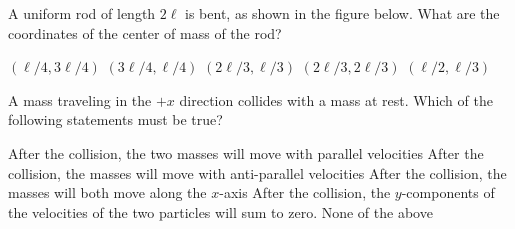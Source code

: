 \documentclass{../../../oss-apphys-exam}
\begin{document}

\raggedcolumns


\begin{questions}
  \question A uniform rod of length $2\ell$ is bent, as shown in the figure
  below. What are the coordinates of the center of mass of the rod?
  \begin{center}
  \end{center}
  \begin{choices}
    \choice $(\ell/4,3\ell/4)$
    \correctchoice $(3\ell/4,\ell/4)$
    \choice $(2\ell/3,\ell/3)$
    \choice $(2\ell/3,2\ell/3)$
    \choice $(\ell/2,\ell/3)$
  \end{choices}
  

  \question A mass traveling in the $+x$ direction collides with a mass at
  rest. Which of the following statements must be true?
  \begin{choices}
    \choice After the collision, the two masses will move with parallel
    velocities
    \choice After the collision, the masses will move with anti-parallel
    velocities
    \choice After the collision, the masses will both move along the $x$-axis
    \choice After the collision, the $y$-components of the velocities of the
    two particles will sum to zero.
    \choice None of the above
  \end{choices}
        

\end{questions}
\end{document}
